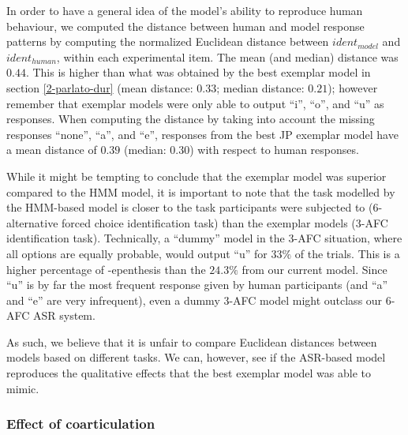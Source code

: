 

In order to have a general idea of the model's ability to reproduce human behaviour, we computed the distance between human and model response patterns by computing the normalized Euclidean distance between $ident_{model}$ and $ident_{human}$, within each experimental item. The mean (and median) distance was $0.44$. This is higher than what was obtained by the best exemplar model in section \ref{2-parlato-dur} (mean distance: $0.33$; median distance: $0.21$); however remember that exemplar models were only able to output ``i'', ``o'', and ``u'' as responses. When computing the distance by taking into account the missing responses ``none'', ``a'', and ``e'', responses from the best JP exemplar model have a mean distance of $0.39$ (median: $0.30$) with respect to human responses.

While it might be tempting to conclude that the exemplar model was superior compared to the HMM model, it is important to note that the task modelled by the HMM-based model is closer to the task participants were subjected to (6-alternative forced choice identification task) than the exemplar models (3-AFC identification task). Technically, a ``dummy'' model in the 3-AFC situation, where all options are equally probable, would output ``u'' for $33\%$ of the trials. This is a higher percentage of -epenthesis than the $24.3\%$ from our current model. Since ``u'' is by far the most frequent response given by human participants (and ``a'' and ``e'' are very infrequent), even a dummy 3-AFC  model might outclass our 6-AFC  ASR system.

As such, we believe that it is unfair to compare Euclidean distances between models based on different tasks. We can, however, see if the ASR-based model reproduces the qualitative effects that the best exemplar model was able to mimic.

\subsubsection{Effect of coarticulation}

